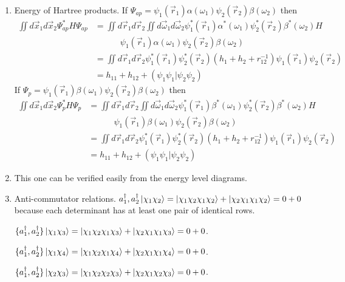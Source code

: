 \begin{enumerate}
\item\label{c2p22} Energy of Hartree products.
If $\Psi_{ap}=\psi_1(\vec{r}_1)\alpha(\omega_1)\psi_2(\vec{r}_2)\beta(\omega_2)$
then
\[
\begin{aligned}
\iint d\vec{x}_1d\vec{x}_2\Psi_{ap}^\ast H \Psi_{ap} &=
\iint d\vec{r}_1d\vec{r}_2\iint d\vec{\omega}_1d\vec{\omega}_2
\psi_1^\ast(\vec{r}_1)\alpha^\ast(\omega_1)\psi_2^\ast(\vec{r}_2)
\beta^\ast(\omega_2)H \\
 &\quad\quad\quad
 \psi_1(\vec{r}_1)\alpha(\omega_1)\psi_2(\vec{r}_2)\beta(\omega_2) \\
 &=\iint d\vec{r}_1d\vec{r}_2\psi_1^\ast(\vec{r}_1)\psi_2^\ast(\vec{r}_2)(h_1 +
 h_2 + r_{12}^{-1})\psi_1(\vec{r}_1)\psi_2(\vec{r}_2) \\
 &= h_{11} + h_{12} + (\psi_1\psi_1|\psi_2\psi_2)
\end{aligned}
\]
If $\Psi_{p}=\psi_1(\vec{r}_1)\beta(\omega_1)\psi_2(\vec{r}_2)\beta(\omega_2)$
then
\[
\begin{aligned}
\iint d\vec{x}_1d\vec{x}_2\Psi_{p}^\ast H \Psi_{p} &=
\iint d\vec{r}_1d\vec{r}_2\iint d\vec{\omega}_1d\vec{\omega}_2
\psi_1^\ast(\vec{r}_1)\beta^\ast(\omega_1)\psi_2^\ast(\vec{r}_2)
\beta^\ast(\omega_2)H \\
 &\quad\quad\quad
 \psi_1(\vec{r}_1)\beta(\omega_1)\psi_2(\vec{r}_2)\beta(\omega_2) \\
 &=\iint d\vec{r}_1d\vec{r}_2\psi_1^\ast(\vec{r}_1)\psi_2^\ast(\vec{r}_2)(h_1 +
 h_2 + r_{12}^{-1})\psi_1(\vec{r}_1)\psi_2(\vec{r}_2) \\
 &= h_{11} + h_{12} + (\psi_1\psi_1|\psi_2\psi_2)
\end{aligned}
\]

\item\label{c2p23} This one can be verified easily from the energy level 
diagrams.

\item\label{c2p24} Anti-commutator relations.
${a_1^\dagger, a_2^\dagger}\ket{\chi_1\chi_2} = \ket{\chi_1\chi_2\chi_1\chi_2}
+ \ket{\chi_2\chi_1\chi_1\chi_2} = 0 + 0$ because each determinant has at least
one pair of identical rows.

$\{a_1^\dagger, a_2^\dagger\}\ket{\chi_1\chi_3} = \ket{\chi_1\chi_2\chi_1\chi_3}
+ \ket{\chi_2\chi_1\chi_1\chi_3} = 0 + 0$.

$\{a_1^\dagger, a_2^\dagger\}\ket{\chi_1\chi_4} = \ket{\chi_1\chi_2\chi_1\chi_4}
+ \ket{\chi_2\chi_1\chi_1\chi_4} = 0 + 0$.

$\{a_1^\dagger, a_2^\dagger\}\ket{\chi_2\chi_3} = \ket{\chi_1\chi_2\chi_2\chi_3}
+ \ket{\chi_2\chi_1\chi_2\chi_3} = 0 + 0$.


\end{enumerate}
